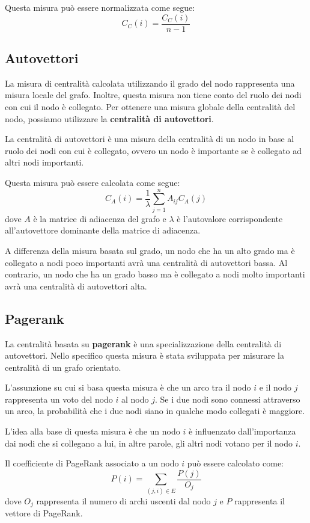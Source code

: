 Questa misura può essere normalizzata come segue:
\begin{equation}
    C_C(i) = \frac{C_C(i)}{n - 1}
\end{equation}
\subsection{Autovettori}
La misura di centralità calcolata utilizzando il grado del nodo rappresenta una
misura locale del grafo. Inoltre, questa misura non tiene conto del ruolo dei
nodi con cui il nodo è collegato. Per ottenere una misura globale della
centralità del nodo, possiamo utilizzare la \textbf{centralità di autovettori}.

La centralità di autovettori è una misura della centralità di un nodo in base
al ruolo dei nodi con cui è collegato, ovvero un nodo è importante se è
collegato ad altri nodi importanti.

Questa misura può essere calcolata come segue:
\begin{equation}
    C_A(i) = \frac{1}{\lambda} \sum_{j=1}^{n} A_{ij} C_A(j)
\end{equation}
dove $A$ è la matrice di adiacenza del grafo e $\lambda$ è l'autovalore
corrispondente all'autovettore dominante della matrice di adiacenza.

A differenza della misura basata sul grado, un nodo che ha un alto grado ma è
collegato a nodi poco importanti avrà una centralità di autovettori bassa. Al
contrario, un nodo che ha un grado basso ma è collegato a nodi molto importanti
avrà una centralità di autovettori alta.
\subsection{Pagerank}
La centralità basata su \textbf{pagerank} è una specializzazione della centralità
di autovettori. Nello specifico questa misura è stata sviluppata per misurare
la centralità di un grafo orientato.

L'assunzione su cui si basa questa misura è che un arco tra il nodo $i$ e il
nodo $j$ rappresenta un voto del nodo $i$ al nodo $j$. Se i due nodi sono connessi
attraverso un arco, la probabilità che i due nodi siano in qualche modo collegati
è maggiore.

L'idea alla base di questa misura è che un nodo $i$ è influenzato dall'importanza
dai nodi che si collegano a lui, in altre parole, gli altri nodi votano per il
nodo $i$.

Il coefficiente di PageRank associato a un nodo $i$ può essere calcolato come:
\begin{equation}
    P(i) = \sum_{(j, i) \in E} \frac{P(j)}{O_j}
\end{equation}
dove $O_j$ rappresenta il numero di archi uscenti dal nodo $j$ e $P$ rappresenta
il vettore di PageRank.

